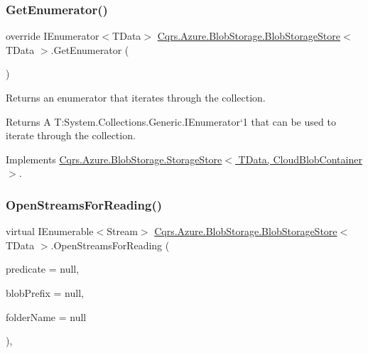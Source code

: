 \subsubsection{\texorpdfstring{Get\+Enumerator()}{GetEnumerator()}}
{\footnotesize\ttfamily override I\+Enumerator$<$T\+Data$>$ \hyperlink{classCqrs_1_1Azure_1_1BlobStorage_1_1BlobStorageStore}{Cqrs.\+Azure.\+Blob\+Storage.\+Blob\+Storage\+Store}$<$ T\+Data $>$.Get\+Enumerator (\begin{DoxyParamCaption}{ }\end{DoxyParamCaption})\hspace{0.3cm}{\ttfamily [virtual]}}



Returns an enumerator that iterates through the collection. 

\begin{DoxyReturn}{Returns}
A T\+:\+System.\+Collections.\+Generic.\+I\+Enumerator`1 that can be used to iterate through the collection. 
\end{DoxyReturn}


Implements \hyperlink{classCqrs_1_1Azure_1_1BlobStorage_1_1StorageStore_a2eb689ea51d586309b79d6cbac05b616_a2eb689ea51d586309b79d6cbac05b616}{Cqrs.\+Azure.\+Blob\+Storage.\+Storage\+Store$<$ T\+Data, Cloud\+Blob\+Container $>$}.

\mbox{\label{classCqrs_1_1Azure_1_1BlobStorage_1_1BlobStorageStore_a6a916e23890ba65048e449353bbd17c2_a6a916e23890ba65048e449353bbd17c2}} 
\subsubsection{\texorpdfstring{Open\+Streams\+For\+Reading()}{OpenStreamsForReading()}}
{\footnotesize\ttfamily virtual I\+Enumerable$<$Stream$>$ \hyperlink{classCqrs_1_1Azure_1_1BlobStorage_1_1BlobStorageStore}{Cqrs.\+Azure.\+Blob\+Storage.\+Blob\+Storage\+Store}$<$ T\+Data $>$.Open\+Streams\+For\+Reading (\begin{DoxyParamCaption}\item[{Func$<$ Cloud\+Block\+Blob, bool $>$}]{predicate = {\ttfamily null},  }\item[{string}]{blob\+Prefix = {\ttfamily null},  }\item[{string}]{folder\+Name = {\ttfamily null} }\end{DoxyParamCaption})\hspace{0.3cm}{\ttfamily [protected]}, {\ttfamily [virtual]}}



